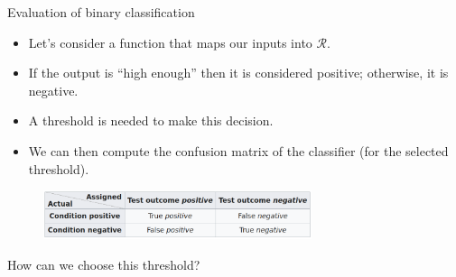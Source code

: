 \documentclass[xcolor=pdftex,dvipsnames,table,mathserif]{beamer}
\begin{document}
\begin{frame}{Evaluation of binary classification}

\begin{itemize}
\item Let's consider a function that maps our inputs into $\mathcal{R}$.
\item If the output is ``high enough'' then it is considered positive; otherwise, it is negative.
\item A threshold is needed to make this decision.
\item We can then compute the \alert{confusion matrix} of the classifier (for the selected threshold).
\end{itemize}

  \begin{figure}[ht]
    \centering
    \includegraphics[width=0.7\textwidth]{contingency_table}
  \end{figure}


  \begin{alertblock}{}
   How can we choose this threshold?
  \end{alertblock}

\end{frame}
\end{document}
